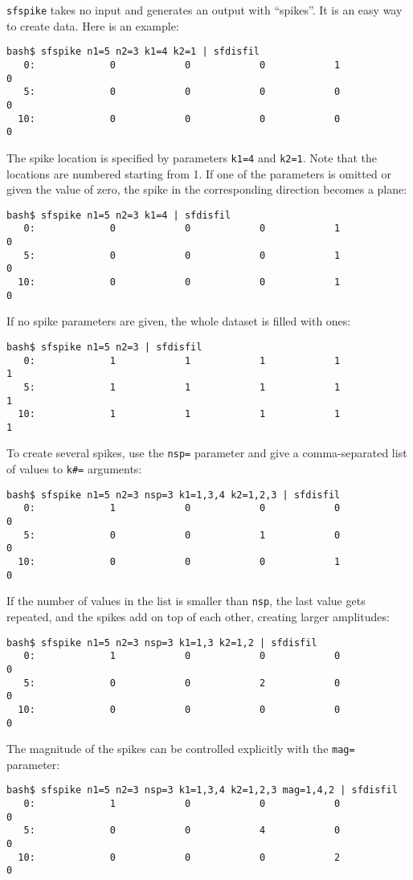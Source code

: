 \texttt{sfspike} takes no input and generates an output with
``spikes''. It is an easy way to create data. Here is an example:
\begin{verbatim}
bash$ sfspike n1=5 n2=3 k1=4 k2=1 | sfdisfil
   0:             0            0            0            1            0
   5:             0            0            0            0            0
  10:             0            0            0            0            0
\end{verbatim}
The spike location is specified by parameters \texttt{k1=4} and
\texttt{k2=1}. Note that the locations are numbered starting from 1. 
If one of the parameters is omitted or given the value of zero, the 
spike in the corresponding direction becomes a plane:
\begin{verbatim}
bash$ sfspike n1=5 n2=3 k1=4 | sfdisfil   
   0:             0            0            0            1            0
   5:             0            0            0            1            0
  10:             0            0            0            1            0

\end{verbatim}
If no spike parameters are given, the whole dataset is filled with ones:
\begin{verbatim}
bash$ sfspike n1=5 n2=3 | sfdisfil
   0:             1            1            1            1            1
   5:             1            1            1            1            1
  10:             1            1            1            1            1
\end{verbatim}

To create several spikes, use the \texttt{nsp=} parameter and give a comma-separated list of values to \texttt{k\#=} arguments:
\begin{verbatim}
bash$ sfspike n1=5 n2=3 nsp=3 k1=1,3,4 k2=1,2,3 | sfdisfil
   0:             1            0            0            0            0
   5:             0            0            1            0            0
  10:             0            0            0            1            0
\end{verbatim}
If the number of values in the list is smaller than \texttt{nsp}, the
last value gets repeated, and the spikes add on top of each other,
creating larger amplitudes:
\begin{verbatim}
bash$ sfspike n1=5 n2=3 nsp=3 k1=1,3 k2=1,2 | sfdisfil
   0:             1            0            0            0            0
   5:             0            0            2            0            0
  10:             0            0            0            0            0
\end{verbatim}
The magnitude of the spikes can be controlled explicitly with the
\texttt{mag=} parameter:
\begin{verbatim}
bash$ sfspike n1=5 n2=3 nsp=3 k1=1,3,4 k2=1,2,3 mag=1,4,2 | sfdisfil
   0:             1            0            0            0            0
   5:             0            0            4            0            0
  10:             0            0            0            2            0
\end{verbatim}

